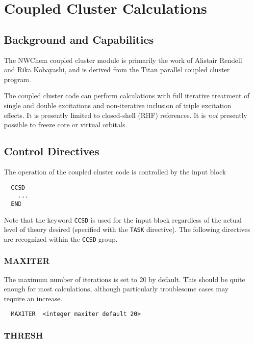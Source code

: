 \section{Coupled Cluster Calculations}
\label{sec:ccsd}

\subsection{Background and Capabilities}

The NWChem coupled cluster module is primarily the work of Alistair
Rendell and Rika Kobayashi, and is derived from the Titan parallel
coupled cluster program.

The coupled cluster code can perform calculations with full iterative
treatment of single and double excitations and non-iterative inclusion
of triple excitation effects.  It is presently limited to closed-shell
(RHF) references.  It is {\em not} presently possible to freeze core or
virtual orbitals.

\subsection{Control Directives}

The operation of the coupled cluster code is controlled by the input
block
\begin{verbatim}
  CCSD
    ...
  END
\end{verbatim}
Note that the keyword \verb+CCSD+ is used for the input block
regardless of the actual level of theory desired (specified with the
\verb+TASK+ directive).  The following directives are recognized
within the \verb+CCSD+ group.

\subsubsection{MAXITER}

The maximum number of iterations is set to 20 by default.  This should
be quite enough for most calculations, although particularly
troublesome cases may require an increase.

\begin{verbatim}
  MAXITER  <integer maxiter default 20>
\end{verbatim}

\subsubsection{THRESH}

